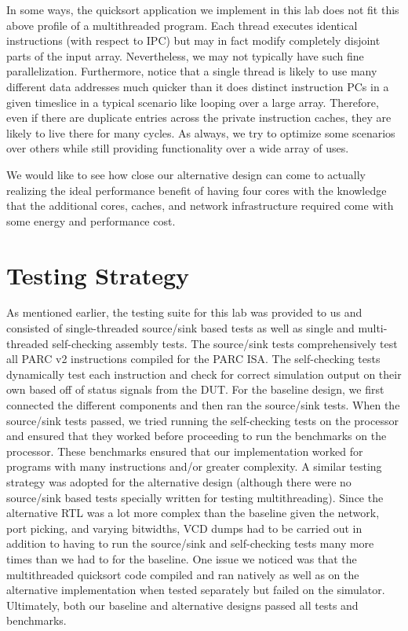\documentclass[10pt]{article}
\begin{document}
In some ways, the quicksort application we implement in this lab does not fit this above profile of a multithreaded program. Each thread executes identical instructions (with respect to IPC) but may in fact modify completely disjoint parts of the input array. Nevertheless, we may not typically have such fine parallelization. Furthermore, notice that a single thread is likely to use many different data addresses much quicker than it does distinct instruction PCs in a given timeslice in a typical scenario like looping over a large array. Therefore, even if there are duplicate entries across the private instruction caches, they are likely to live there for many cycles. As always, we try to optimize some scenarios over others while still providing functionality over a wide array of uses.

We would like to see how close our alternative design can come to actually realizing the ideal performance benefit of having four cores with the knowledge that the additional cores, caches, and network infrastructure required come with some energy and performance cost.


\section{Testing Strategy}

As mentioned earlier, the testing suite for this lab was provided to us and consisted of single-threaded source/sink based tests as well as single and multi-threaded self-checking assembly tests. The source/sink tests comprehensively test all PARC v2 instructions compiled for the PARC ISA. The self-checking tests dynamically test each instruction and check for correct simulation output on their own based off of status signals from the DUT. For the baseline design, we first connected the different components and then ran the source/sink tests. When the source/sink tests passed, we tried running the self-checking tests on the processor and ensured that they worked before proceeding to run the benchmarks on the processor. These benchmarks ensured that our implementation worked for programs with many instructions and/or greater complexity. A similar testing strategy was adopted for the alternative design (although there were no source/sink based tests specially written for testing multithreading). Since the alternative RTL was a lot more complex than the baseline given the network, port picking, and varying bitwidths, VCD dumps had to be carried out in addition to having to run the source/sink and self-checking tests many more times than we had to for the baseline. One issue we noticed was that the multithreaded quicksort code compiled and ran natively as well as on the alternative implementation when tested separately but failed on the simulator. Ultimately, both our baseline and alternative designs passed all tests and benchmarks. 
\end{document}
